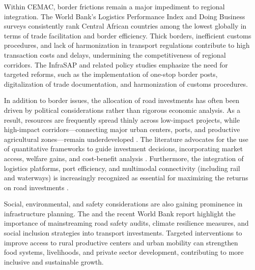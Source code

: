 \documentclass[a4paper]{article}
\begin{document}
Within CEMAC, border frictions remain a major impediment to regional integration. The World Bank’s Logistics Performance Index \citep{LPI2023} and Doing Business surveys \citep{fontagne2023trade} consistently rank Central African countries among the lowest globally in terms of trade facilitation and border efficiency. Thick borders, inefficient customs procedures, and lack of harmonization in transport regulations contribute to high transaction costs and delays, undermining the competitiveness of regional corridors. The InfraSAP and related policy studies \citep{WorldBank2025_CEMAC_InfrastructureSAP, AfricanUnion2021_AfricanIntegrationReport} emphasize the need for targeted reforms, such as the implementation of one-stop border posts, digitalization of trade documentation, and harmonization of customs procedures. \newline 

In addition to border issues, the allocation of road investments has often been driven by political considerations rather than rigorous economic analysis. As a result, resources are frequently spread thinly across low-impact projects, while high-impact corridors—connecting major urban centers, ports, and productive agricultural zones—remain underdeveloped \citep{collier2016cost, krantz2024optimal}. The literature advocates for the use of quantitative frameworks to guide investment decisions, incorporating market access, welfare gains, and cost-benefit analysis \citep{donaldson2016railroads, fajgelbaum2020optimal, krantz2024optimal, herrera2024shrinking, donaldson2025transport, FajgelbaumGaubert2025Optimal, allen2025evaluating}. Furthermore, the integration of logistics platforms, port efficiency, and multimodal connectivity (including rail and waterways) is increasingly recognized as essential for maximizing the returns on road investments \citep{WorldBank2025_ContainerPortindex, AfDB2022_AfricanPortsconnectivity}. \newline 

Social, environmental, and safety considerations are also gaining prominence in infrastructure planning. The \citet{AfDB2022_AfricanEconomicOutlook} and the recent World Bank report \citet{WorldBank2020_StrengtheningResilience} highlight the importance of mainstreaming road safety audits, climate resilience measures, and social inclusion strategies into transport investments. Targeted interventions to improve access to rural productive centers and urban mobility can strengthen food systems, livelihoods, and private sector development, contributing to more inclusive and sustainable growth. \newline 
\end{document}

